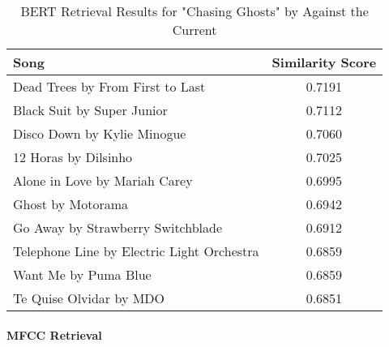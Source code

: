 \documentclass[sigconf]{acmart}
\begin{document}
\begin{table}[ht]
    \centering
    \caption{BERT Retrieval Results for "Chasing Ghosts" by Against the Current}
    \label{tab:bert_chasing_ghosts}
    \begin{tabular}{lc}
        \toprule
        \textbf{Song}                        & \textbf{Similarity Score} \\
        \midrule
        Dead Trees by From First to Last      & 0.7191                      \\
        Black Suit by Super Junior            & 0.7112                      \\
        Disco Down by Kylie Minogue            & 0.7060                      \\
        12 Horas by Dilsinho                   & 0.7025                      \\
        Alone in Love by Mariah Carey          & 0.6995                      \\
        Ghost by Motorama                      & 0.6942                      \\
        Go Away by Strawberry Switchblade       & 0.6912                      \\
        Telephone Line by Electric Light Orchestra & 0.6859                  \\
        Want Me by Puma Blue                   & 0.6859                      \\
        Te Quise Olvidar by MDO                 & 0.6851                      \\
        \bottomrule
    \end{tabular}
\end{table}

\paragraph{MFCC Retrieval}
\end{document}
